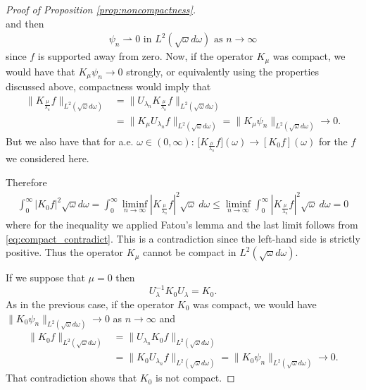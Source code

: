 \documentclass[reqno,11pt,letterpaper]{amsart}
\numberwithin{equation}{section}
\begin{document}
\begin{proof}[Proof of Proposition \ref{prop:noncompactness}]
$$ $$
    and then 
   \begin{align}
   \psi_n \rightharpoonup 0\,\,\text{in}\,\, L^2(\sqrt{\omega}d\omega)\,\,\text{as}\,\, n \to \infty
   \end{align}
  since $f$ is supported away from zero. 
    Now, if the operator $K_\mu$ was compact, we would have that $K_\mu \psi_n \to 0$ strongly, or equivalently using the properties discussed above, compactness would imply that 
    \begin{equation} \label{eq:compact_contradict}
    \begin{split}
    \| K_{\tfrac{\mu}{\lambda_n}} f \|_{L^2(\sqrt{\omega}d\omega)} &= \| U_{\lambda_n} K_{\tfrac{\mu}{\lambda_n}} f \|_{L^2(\sqrt{\omega}d\omega)} 
    \\ &= \| K_\mu U_{\lambda_n} f \|_{L^2(\sqrt{\omega}d\omega)} = \|K_\mu \psi_n \|_{L^2(\sqrt{\omega}d\omega)} \to 0.
    \end{split}
    \end{equation} 
    But we also have that for a.e. $\omega \in (0,\infty)$:  $\Big[ K_{\tfrac{\mu}{\lambda_n}} f\Big] (\omega) \to [K_0 f] (\omega)$ for the $f$ we considered here.
    
    Therefore
    \begin{align*}
        \int_0^\infty |K_0 f|^2 \sqrt{\omega} d \omega = \int_0^\infty \liminf_{n \to \infty} \left\vert K_{\tfrac{\mu}{\lambda_n}} f\right\vert^2 \sqrt{\omega} \ d \omega \leq  \liminf_{n \to \infty} \int_0^\infty  \left\vert K_{\tfrac{\mu}{\lambda_n}} f\right\vert^2 \sqrt{\omega} \ d \omega =0 
    \end{align*}
    where for the inequality we applied Fatou's lemma and the last limit follows from \eqref{eq:compact_contradict}. This is a contradiction since the left-hand side is  strictly positive. Thus the operator $K_{\mu}$ cannot be compact in $L^2(\sqrt{\omega}d\omega)$. 
    
    If we suppose  that $\mu =0$ then 
    $$U_\lambda^{-1} K_0 U_\lambda = K_{0}.$$
 As in the previous case, if the operator $K_0$ was compact, we would have $\|K_0\psi_n\|_{ L^2(\sqrt \omega d\omega ) }\to 0$ as $n\to \infty$ and 
     \begin{equation} \label{eq:compact_contradict2}
    \begin{split}
    \| K_0 f \|_{L^2(\sqrt{\omega}d\omega)} &= \| U_{\lambda_n} K_0 f \|_{L^2(\sqrt{\omega}d\omega)} 
    \\ &= \| K_0 U_{\lambda_n} f \|_{L^2(\sqrt{\omega}d\omega)} = \|K_0 \psi_n \|_{L^2(\sqrt{\omega}d\omega)} \to 0.
    \end{split}
    \end{equation} 
That contradiction shows that $K_0$ is not compact. 
 \end{proof}
\end{document}
